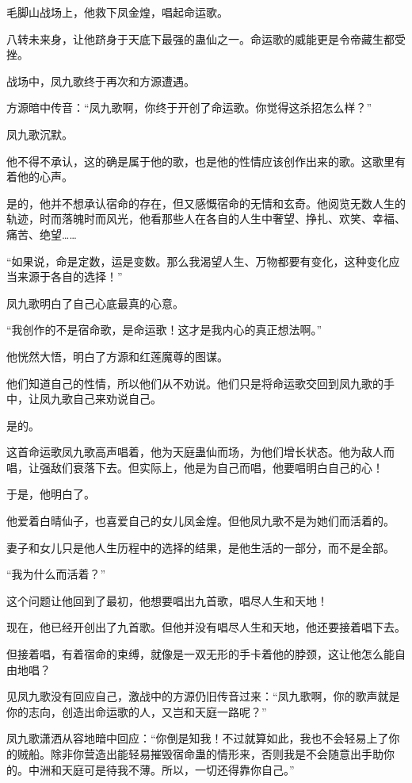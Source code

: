 \begin{this_body}
毛脚山战场上，他救下凤金煌，唱起命运歌。

八转未来身，让他跻身于天底下最强的蛊仙之一。命运歌的威能更是令帝藏生都受挫。

战场中，凤九歌终于再次和方源遭遇。

方源暗中传音：“凤九歌啊，你终于开创了命运歌。你觉得这杀招怎么样？”

凤九歌沉默。

他不得不承认，这的确是属于他的歌，也是他的性情应该创作出来的歌。这歌里有着他的心声。

是的，他并不想承认宿命的存在，但又感慨宿命的无情和玄奇。他阅览无数人生的轨迹，时而落魄时而风光，他看那些人在各自的人生中奢望、挣扎、欢笑、幸福、痛苦、绝望……

“如果说，命是定数，运是变数。那么我渴望人生、万物都要有变化，这种变化应当来源于各自的选择！”

凤九歌明白了自己心底最真的心意。

“我创作的不是宿命歌，是命运歌！这才是我内心的真正想法啊。”

他恍然大悟，明白了方源和红莲魔尊的图谋。

他们知道自己的性情，所以他们从不劝说。他们只是将命运歌交回到凤九歌的手中，让凤九歌自己来劝说自己。

是的。

这首命运歌凤九歌高声唱着，他为天庭蛊仙而场，为他们增长状态。他为敌人而唱，让强敌们衰落下去。但实际上，他是为自己而唱，他要唱明白自己的心！

于是，他明白了。

他爱着白晴仙子，也喜爱自己的女儿凤金煌。但他凤九歌不是为她们而活着的。

妻子和女儿只是他人生历程中的选择的结果，是他生活的一部分，而不是全部。

“我为什么而活着？”

这个问题让他回到了最初，他想要唱出九首歌，唱尽人生和天地！

现在，他已经开创出了九首歌。但他并没有唱尽人生和天地，他还要接着唱下去。

但接着唱，有着宿命的束缚，就像是一双无形的手卡着他的脖颈，这让他怎么能自由地唱？

见凤九歌没有回应自己，激战中的方源仍旧传音过来：“凤九歌啊，你的歌声就是你的志向，创造出命运歌的人，又岂和天庭一路呢？”

凤九歌潇洒从容地暗中回应：“你倒是知我！不过就算如此，我也不会轻易上了你的贼船。除非你营造出能轻易摧毁宿命蛊的情形来，否则我是不会随意出手助你的。中洲和天庭可是待我不薄。所以，一切还得靠你自己。”


\end{this_body}
